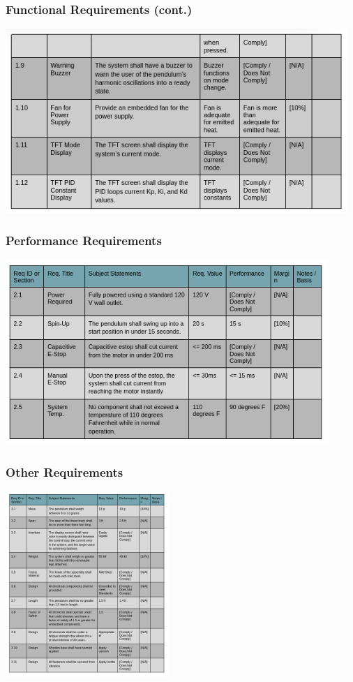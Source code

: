 \documentclass[aspectratio=169]{beamer}
\begin{document}
\begin{frame}
    \frametitle{Functional Requirements (cont.)}

    \includegraphics[height=7cm]{Functional2}
\end{frame}

\begin{frame}
    \frametitle{Performance Requirements}

    \includegraphics[height=7cm]{Performance}
\end{frame}


\begin{frame}
    \frametitle{Other Requirements}

    \includegraphics[height=7cm]{OtherReqs}
\end{frame}
\end{document}
